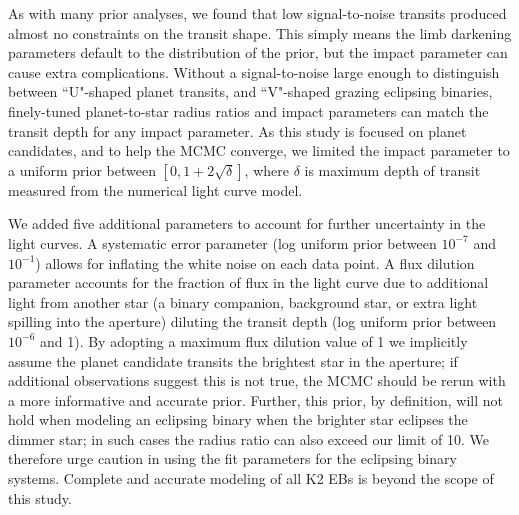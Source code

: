 \documentclass[twocolumn]{aastex62}
\begin{document}
As with many prior analyses, we found that low signal-to-noise
transits produced almost no constraints on the transit shape. This
simply means the limb darkening parameters default to the distribution
of the prior, but the impact parameter can cause extra
complications. Without a signal-to-noise large enough to distinguish
between ``U"-shaped planet transits, and ``V"-shaped grazing eclipsing
binaries, finely-tuned planet-to-star radius ratios and impact
parameters can match the transit depth for any impact parameter. As
this study is focused on planet candidates, and to help the MCMC
converge, we limited the impact parameter to a uniform prior between
$[0, 1 + 2 \sqrt{\delta}]$, where $\delta$ is maximum depth of transit
measured from the numerical light curve model.

We added five additional parameters to account for further uncertainty
in the light curves.  A systematic error parameter (log uniform prior
between $10^{-7}$ and $10^{-1}$) allows for inflating the white noise
on each data point. A flux dilution parameter accounts for the
fraction of flux in the light curve due to additional light from
another star (a binary companion, background star, or extra light
spilling into the aperture) diluting the transit depth (log uniform
prior between $10^{-6}$ and 1).  By adopting a maximum flux dilution
value of 1 we implicitly assume the planet candidate transits the
brightest star in the aperture; if additional observations suggest
this is not true, the MCMC should be rerun with a more informative and
accurate prior. Further, this prior, by definition, will not hold when
modeling an eclipsing binary when the brighter star eclipses the
dimmer star; in such cases the radius ratio can also exceed our limit
of 10.  We therefore urge caution in using the fit parameters for the
eclipsing binary systems. Complete and accurate modeling of all K2 EBs
is beyond the scope of this study.
\end{document}
